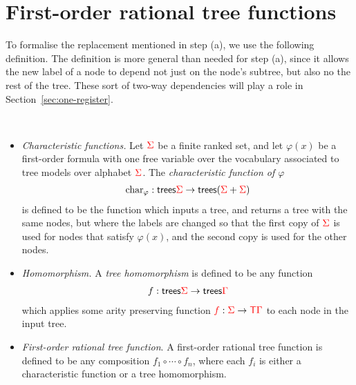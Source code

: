 \section{First-order rational tree functions}\label{sec:fo-translation}

To formalise the replacement mentioned in step (a), we use the following definition. The definition is more general than needed for step (a), since it allows the new label of a node to depend not just on the node's subtree, but also no the rest of the tree. These sort of two-way dependencies will play a role in Section~\ref{sec:one-register}.


\begin{definition} \label{def:forat}\ 
    \begin{itemize}
        \item \emph{Characteristic functions.}  Let ${\color{red}{\Sigma}}$ be a finite ranked set, and let $\varphi(x)$ be a first-order formula with one free variable over the vocabulary associated to tree models over alphabet ${\color{red}{\Sigma}}$. The \emph{characteristic function of $\varphi$} 
        \begin{align*}
            \mathrm{char}_\varphi : \mathsf {trees} {\color{red}{\Sigma}} \to \mathsf {trees} ({\color{red}{\Sigma}} + {\color{red}{\Sigma}})
        \end{align*}
        is defined to be the function which inputs a tree, and returns a tree with the same nodes, but where the labels are changed so that the first copy of ${\color{red}{\Sigma}}$ is used for nodes that satisfy  $\varphi(x)$, and the second copy is used for the other nodes.
        \item \emph{Homomorphism.} A \emph{tree homomorphism} is defined to be any function
        \begin{align*}
            f : \mathsf {trees} {\color{red}{\Sigma}} \to \mathsf {trees} {\color{red}{\Gamma}}
        \end{align*} 
        which applies some arity preserving function ${\color{red}{f}} : {\color{red}{\Sigma}} \to {\color{red}{\mathsf T}} {\color{red}{\Gamma}}$ to each node in the input tree. 
        \item \emph{First-order rational tree function}. A first-order rational tree function is defined to be any composition $f_1 \circ \cdots \circ f_n$, where each $f_i$ is either a characteristic function or a tree homomorphism.
    \end{itemize}
      \end{definition}




